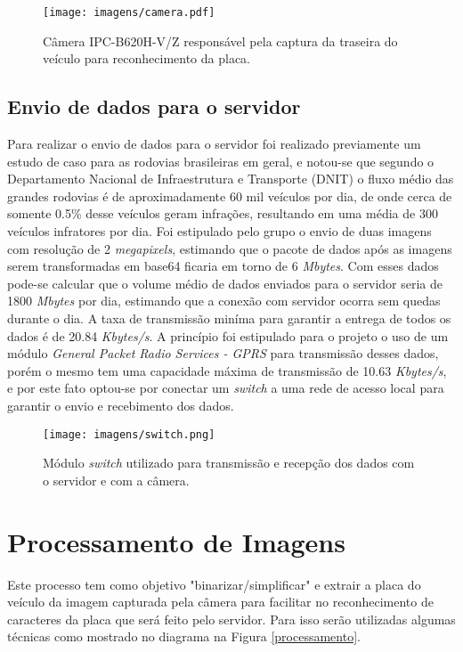     \begin{figure}[H]
    \centering
    \texttt{[image: imagens/camera.pdf]}
    \caption{Câmera IPC-B620H-V/Z responsável pela captura da traseira do veículo para reconhecimento da placa.}
    \label{camera}
\end{figure}

    
    \subsection{Envio de dados para o servidor}
    Para realizar o envio de dados para o servidor foi realizado previamente um estudo de caso para as rodovias brasileiras em geral, e notou-se que segundo o Departamento Nacional de Infraestrutura e Transporte (DNIT) o fluxo médio das grandes rodovias é de aproximadamente 60 mil veículos por dia, de onde cerca de somente 0.5\% desse veículos geram infrações, resultando em uma média de 300 veículos infratores por dia. Foi estipulado pelo grupo o envio de duas imagens com resolução de 2 \emph{megapixels}, estimando que o pacote de dados após as imagens serem transformadas em base64 ficaria em torno de 6 \emph{Mbytes}. Com esses dados pode-se calcular que o volume médio de dados enviados para o servidor seria de 1800 \emph{Mbytes} por dia, estimando que a conexão com servidor ocorra sem quedas durante o dia. A taxa de transmissão miníma para garantir a entrega de todos os dados é de 20.84 \emph{Kbytes/s}. A princípio foi estipulado para o projeto o uso de um módulo \emph{General Packet Radio Services - GPRS} para transmissão desses dados, porém o mesmo tem uma capacidade máxima de transmissão de 10.63 \emph{Kbytes/s}, e por este fato optou-se por conectar um \emph{switch} a uma rede de acesso local para garantir o envio e recebimento dos dados. 
        \begin{figure}[H]
            \centering
            \texttt{[image: imagens/switch.png]}
            \caption{Módulo \emph{switch} utilizado para transmissão e recepção dos dados com o servidor e com a câmera.}
            \label{switch}
        \end{figure}

\section{Processamento de Imagens}

Este processo tem como objetivo "binarizar/simplificar" e extrair a placa do veículo da imagem capturada pela câmera para facilitar no reconhecimento de caracteres da placa que será feito pelo servidor. Para isso serão utilizadas algumas técnicas como mostrado no diagrama na Figura \ref{processamento}.

